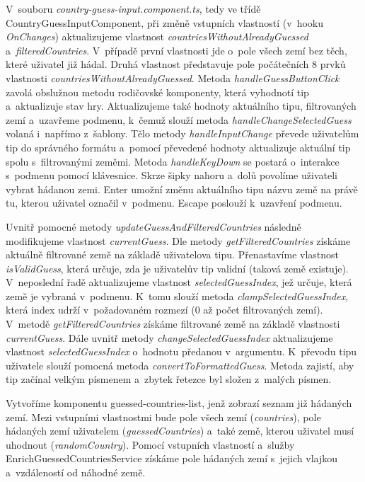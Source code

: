 V~souboru \emph{country-guess-input.component.ts}, tedy ve třídě CountryGuessInputComponent, při změně vstupních vlastností (v~hooku \emph{OnChanges}) aktualizujeme vlastnost \emph{countriesWithoutAlreadyGuessed} a~\emph{filteredCountries}. 
V~případě první vlastnosti jde o~pole všech zemí bez těch, které uživatel již hádal. Druhá vlastnost představuje pole počátečních 8 prvků vlastnosti \emph{countriesWithoutAlreadyGuessed}. 
Metoda \emph{handleGuessButtonClick} zavolá obslužnou metodu rodičovské komponenty, která vyhodnotí tip a~aktualizuje stav hry. 
Aktualizujeme také hodnoty aktuálního tipu, filtrovaných zemí a~uzavřeme podmenu, k~čemuž slouží metoda \emph{handleChangeSelectedGuess} volaná i~napřímo z~šablony. 
Tělo metody \emph{handleInputChange} převede uživatelům tip do správného formátu a~pomocí převedené hodnoty aktualizuje aktuální tip spolu s~filtrovanými zeměmi.
Metoda \emph{handleKeyDown} se postará o~interakce s~podmenu pomocí klávesnice. Skrze šipky nahoru a~dolů povolíme uživateli vybrat hádanou zemi. 
Enter umožní změnu aktuálního tipu názvu země na právě tu, kterou uživatel označil v~podmenu. Escape poslouží k~uzavření podmenu.

Uvnitř pomocné metody \emph{updateGuessAndFilteredCountries} následně modifikujeme vlastnost \emph{currentGuess}. 
Dle metody \emph{getFilteredCountries} získáme aktuálně filtrované země na základě uživatelova tipu. 
Přenastavíme vlastnost \emph{isValidGuess}, která určuje, zda je uživatelův tip validní (taková země existuje). 
V~neposlední řadě aktualizujeme vlastnost \emph{selectedGuessIndex}, jež určuje, která země je vybraná v~podmenu. 
K~tomu slouží metoda \emph{clampSelectedGuessIndex}, která index udrží v~požadovaném rozmezí (0 až počet filtrovaných zemí).
V~metodě \emph{getFilteredCountries} získáme filtrované země na základě vlastnosti \emph{currentGuess}. 
Dále uvnitř metody \emph{changeSelectedGuessIndex} aktualizujeme vlastnost \emph{selectedGuessIndex} o~hodnotu předanou v~argumentu. 
K~převodu tipu uživatele slouží pomocná metoda \emph{convertToFormattedGuess}. Metoda zajistí, aby tip začínal velkým písmenem a~zbytek řetezce byl složen z~malých písmen.

Vytvoříme komponentu guessed-countries-list, jenž zobrazí seznam již hádaných zemí. 
Mezi vstupními vlastnostmi bude pole všech zemí (\emph{countries}), pole hádaných zemí uživatelem (\emph{guessedCountries}) a~také země, kterou uživatel musí uhodnout (\emph{randomCountry}).
Pomocí vstupních vlastností a~služby EnrichGuessedCountriesService získáme pole hádaných zemí s~jejich vlajkou a~vzdáleností od náhodné země. 

